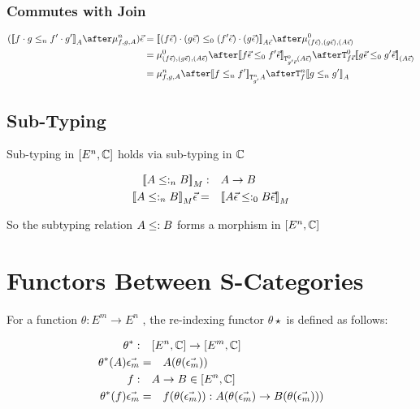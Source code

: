 \documentclass{report}
\begin{document}
\subsubsection{Commutes with Join}


\begin{align}
    (\dsen{f\dot g}{f'\dot g'}_A\after\bindn{f}{g}{A})\ev & = \dsez{(f\ev)\dot(g\ev)}{(f'\ev)\dot (g\ev)}_{A\ev}\after\bindz{(f\ev)}{(g\ev)}{(A\ev)}\\
    & = \bindz{(f\ev)}{(g\ev)}{(A\ev)}\after\dsez{f\ev}{f'\ev}_{\Tz{g'\ev}{(A\ev)}}\after \Tz{f\ev}{\dsez{g\ev}{g'\ev}}_{(A\ev)}\\
    &= \bindn{f}{g}{A}\after\dsen{f}{f'}_{\Tn{g'}{A}}\after\Tn{f}{\dsen{g}{g'}}_A
\end{align}

\subsection{Sub-Typing}
Sub-typing in $[E^n, \mathbb{C}]$ holds via sub-typing in $\mathbb{C}$

\begin{align}
    {\bf [\![}A\leq:_n B{\bf ]\!]}_M:&\quad A\rightarrow B\\
    {\bf [\![}A\leq:_n B{\bf ]\!]}_M\vec{\epsilon}=&\quad {\bf [\![}A\vec{\epsilon}\leq:_0 B\vec{\epsilon}{\bf ]\!]}_M
\end{align}

So the subtyping relation $A \leq: B$ forms a morphism in $[E^n, \mathbb{C}]$

\section{Functors Between S-Categories}
For a function $\theta: E^m \rightarrow E^n$ , the re-indexing functor $\theta\star$ is defined as follows:

\begin{align}
    \theta^*:\quad& [E^n, \mathbb{C}] \rightarrow [E^m, \mathbb{C}]\\
    \theta^*(A)\vec{\epsilon_m}=&\quad A(\theta (\vec{\epsilon_m}))\\
    f:\quad& A \rightarrow B \in[E^n, \mathbb{C}]\\
    \theta^*(f)\vec{\epsilon_m} =&\quad f(\theta(\vec{\epsilon_m})): A(\theta(\vec{\epsilon_m})\rightarrow B(\theta(\vec{\epsilon_m})))
\end{align}
\end{document}
